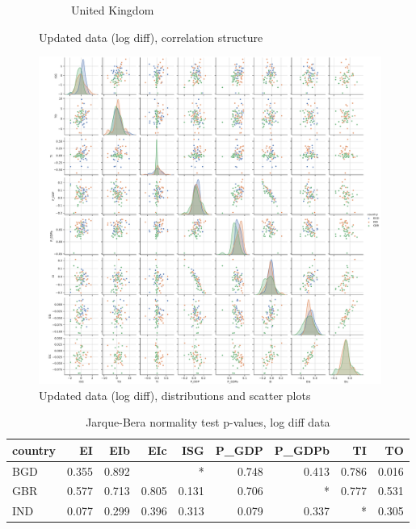 \documentclass[11pt,a4paper]{article}
\begin{document}
\begin{figure}[htbp]
\begin{subfigure}{0.7\textwidth}
\caption{United Kingdom}
\end{subfigure}
\caption{Updated data (log diff), correlation structure}
\label{fig:logdiff_correlations}
\end{figure}

\begin{figure}[htbp]
\centering
\includegraphics[width=\textwidth]{./plots/logdiff_pairplot.pdf}
\caption{Updated data (log diff), distributions and scatter plots}
\label{fig:logdiff_scatterplot}
\end{figure}

\begin{table}[htbp]
\centering
\begin{tabular}{lrrrrrrrr}
\toprule
country &    EI &   EIb &   EIc &   ISG &  P\_GDP &  P\_GDPb &    TI &    TO \\
\midrule
    BGD & 0.355 & 0.892 &       &     * &  0.748 &   0.413 & 0.786 & 0.016 \\
    GBR & 0.577 & 0.713 & 0.805 & 0.131 &  0.706 &       * & 0.777 & 0.531 \\
    IND & 0.077 & 0.299 & 0.396 & 0.313 &  0.079 &   0.337 &     * & 0.305 \\
\bottomrule
\end{tabular}
\caption{Jarque-Bera normality test p-values, log diff data}
\label{tab:normality_test}
\end{table}
\end{document}
